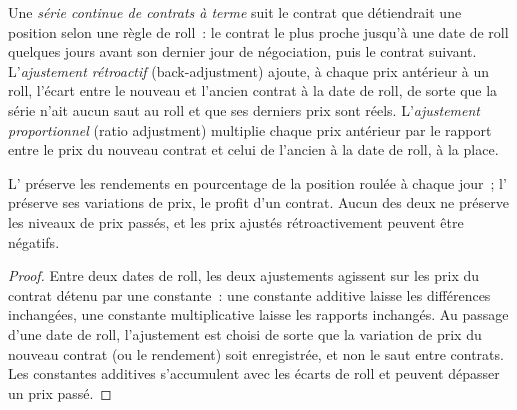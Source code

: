 \begin{definition}\label{def:rs:market-data-for-research:continuous}
Une \emph{série continue de contrats à terme} suit le contrat que détiendrait une position selon une règle de roll~:
le contrat le plus proche jusqu'à une date de roll quelques jours avant son dernier jour de négociation, puis le contrat suivant. L'\emph{ajustement rétroactif} (back-adjustment)
ajoute, à chaque prix antérieur à un roll, l'écart entre le nouveau et l'ancien contrat à la date de roll, de sorte que la série n'ait aucun
saut au roll et que ses derniers prix sont réels. L'\emph{ajustement proportionnel} (ratio adjustment) multiplie chaque prix antérieur par
le rapport entre le prix du nouveau contrat et celui de l'ancien à la date de roll, à la place.
\end{definition}

\begin{proposition}\label{prop:rs:market-data-for-research:adjust}
L' préserve les rendements en pourcentage de la position roulée à chaque jour~; l' préserve ses
variations de prix, le profit d'un contrat. Aucun des deux ne préserve les niveaux de prix passés, et les prix ajustés rétroactivement peuvent être négatifs.
\end{proposition}

\begin{proof}
Entre deux dates de roll, les deux ajustements agissent sur les prix du contrat détenu par une constante~: une constante additive laisse les différences
inchangées, une constante multiplicative laisse les rapports inchangés. Au passage d'une date de roll, l'ajustement est choisi de sorte que la variation de prix du nouveau contrat
(ou le rendement) soit enregistrée, et non le saut entre contrats. Les constantes additives s'accumulent avec les écarts de roll et peuvent dépasser
un prix passé.
\end{proof}

